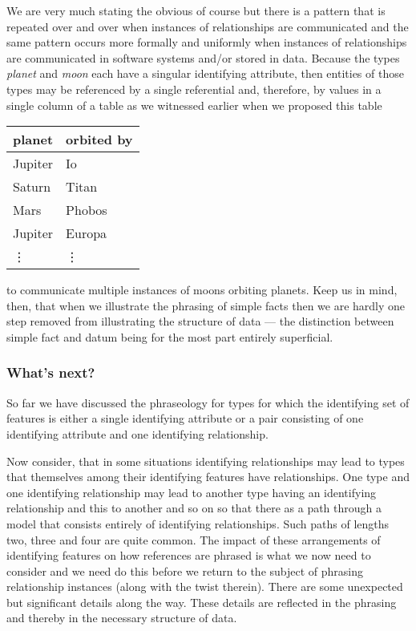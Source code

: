 \mynote
We are very much stating the obvious of course but there is a pattern that is repeated over and over when instances of relationships are communicated  and the same pattern occurs more formally  and uniformly when instances of relationships are communicated in software systems and/or stored in data.
Because 
the types \textit{planet} and \textit{moon} each have
a singular identifying attribute, then entities of those types 
may be referenced by a single referential and, therefore, by values in a
single column of a table as we witnessed earlier when we proposed this table
\begin{center}
\begin{tabular}{|l | l|}
\hline
planet & orbited by \\
\hline\hline
Jupiter  & Io \\
\hline
Saturn   & Titan    \\
\hline
Mars     & Phobos    \\
\hline
Jupiter  & Europa         \\
\hline
\vdots    & \vdots  \\
\hline
\end{tabular}
\end{center}
to communicate multiple instances of moons orbiting planets.
Keep us in mind, then, that when we illustrate the phrasing of simple facts then we are hardly one step removed from illustrating the structure of data --- the distinction between  simple fact and datum being for the most part entirely superficial. 

\subsubsection*{What's next?}
So far we have discussed the phraseology for  types for which the identifying set of features is either a single identifying attribute or a pair consisting of one identifying attribute and one identifying relationship. 

Now consider, that in some situations identifying relationships may lead to types that themselves among their identifying features have relationships.
One type and one identifying relationship may lead to another type
having an identifying relationship and this to another and so on so that there as a path through a model that consists entirely of identifying relationships. Such paths of lengths two, three and four are quite common. 
The impact of these arrangements of identifying features 
on how references are phrased is what we now need to consider and we need do this before we return to the subject of phrasing relationship instances (along with the twist therein). There are some unexpected but significant details along the way. These details are reflected in the phrasing and thereby in the necessary structure of data. 

